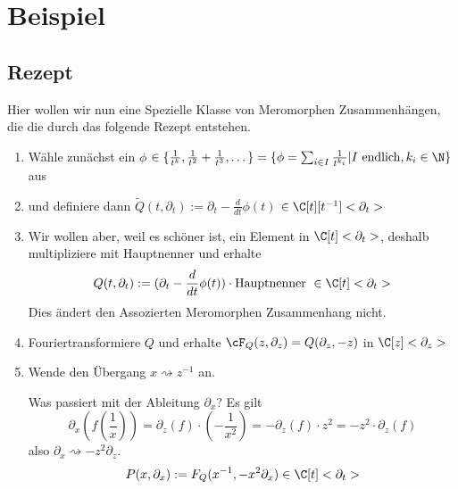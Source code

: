 \chapter{Beispiel}

\section{Rezept} \label{sec:allgemeinProblem}

\begin{comment}
siehe: \cite[5.b]{sabbah_Fourier-local}
\end{comment}

\begin{comment}
sei $\phi\in\{\frac{1}{t^k},\frac{1}{t^2}+\frac{1}{t^3},\dots\}$
\begin{enumerate}
\item Starte mit: $P(t,\partial_t):=(\partial_t-\frac{d}{dt}\phi(t)) \cdot
\mbox{Hauptnenner }\in\C[t]<\partial_t>$
\item Furiertrafo: $F_P(z,\partial_z)=P(\partial_z,-z)\in\C[z]<\partial_z>$
\item $x=z^{-1}$ und $\partial_x=-z^2\partial_z$ \\
\[
Q(x,\partial_x):=F_P(x^{-1},-x^2\partial_x)\cdot \mbox{Hauptnenner
}\in\C[x]<\partial_x>
\]

\textbf{Hauptnenner unnötig?!?}
\item Berechne für $Q$ das NP usw...
\end{enumerate}
\end{comment}

Hier wollen wir nun eine Spezielle Klasse von Meromorphen Zusammenhängen, die
die durch das folgende Rezept entstehen.
\begin{enumerate}
\item Wähle zunächst ein $\phi$ 
$\in\{\frac{1}{t^k},\frac{1}{t^2}+\frac{1}{t^3},\dots\}
=\{\phi=\sum_{i\in I}\frac{1}{t^{k_i}}|I \mbox{ endlich}, k_i\in\N\}$ aus
\item und definiere dann 
$ \tilde Q(t,\partial_t):=\partial_t-\frac{d}{dt}\phi(t)$
$\in\C[t][t^{-1}]<\partial_t>$
\item Wir wollen aber, weil es schöner ist, ein Element in $\C[t]<\partial_t>$,
deshalb multipliziere mit Hauptnenner und erhalte
\[
Q(t,\partial_t):=(\partial_t-\frac{d}{dt}\phi(t)) \cdot
\mbox{Hauptnenner }\in\C[t]<\partial_t>
\]
Dies ändert den Assozierten Meromorphen Zusammenhang nicht.
\begin{comment}
Lemma?
\end{comment}
\item Fouriertransformiere $Q$ und erhalte 
$\cF_Q(z,\partial_z)=Q(\partial_z,-z)$ in $\C[z]<\partial_z>$
\item Wende den Übergang $x\rightsquigarrow z^{-1}$ an.

Was passiert mit der Ableitung $\partial_x$? Es gilt
\[
\partial_x (f(\frac{1}{x}))=
\partial_z(f)\cdot (-\frac{1}{x^2})=
-\partial_z(f)\cdot z^2= %
- z^2 \cdot \partial_z(f)
\]
also $ \partial_x\rightsquigarrow-z^2\partial_z $.
\[
P(x,\partial_x):=F_Q(x^{-1},-x^2\partial_x) \in \C[t]<\partial_t>
\]
\end{enumerate}

